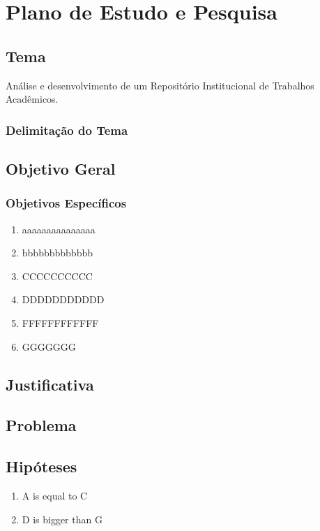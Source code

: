\chapter{Plano de Estudo e Pesquisa} \label{chap:ResearchPlan}




\section{Tema} \label{sec::Theme}
Análise e desenvolvimento de um Repositório Institucional de Trabalhos Acadêmicos.


\subsection{Delimitação do Tema} \label{subsec::ThemeDelimitation}

\lipsum[2-3]

\section{Objetivo Geral} \label{sec:objective}


\subsection{Objetivos Específicos}
\begin{enumerate}
    \item aaaaaaaaaaaaaaa
    \item bbbbbbbbbbbbb
    \item CCCCCCCCCC
    \item DDDDDDDDDDD
    \item FFFFFFFFFFFF
    \item GGGGGGG
\end{enumerate}


\section{Justificativa}\label{sec:justification}



\section{Problema} \label{sec::Problem}



\section{Hipóteses} \label{sec::Hypothesis}
\begin{enumerate}
    \item A is equal to C
    \item D is bigger than G
\end{enumerate}



